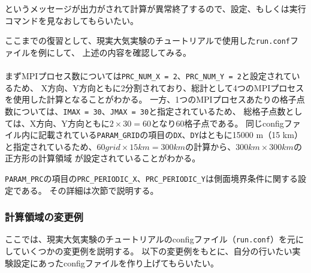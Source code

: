 \noindent というメッセージが出力がされて計算が異常終了するので、設定、もしくは実行コマンドを見なおしてもらいたい。

ここまでの復習として、現実大気実験のチュートリアルで使用した\verb|run.conf|ファイルを例にして、
上述の内容を確認してみる。\\

{\small {\gt
{}}}\\

\noindent まずMPIプロセス数については\verb|PRC_NUM_X = 2|、\verb|PRC_NUM_Y = 2|と設定されているため、
X方向、Y方向ともに2分割されており、総計として4つのMPIプロセスを使用した計算となることがわかる。
一方、1つのMPIプロセスあたりの格子点数については、\verb|IMAX = 30|、\verb|JMAX = 30|と指定されているため、
総格子点数としては、X方向、Y方向ともに$2 \times 30 = 60$となり60格子点である。
同じconfigファイル内に記載されている\verb|PARAM_GRID|の項目の\verb|DX|、\verb|DY|はともに15000 m（15 km）
と指定されているため、$60 grid \times 15 km = 300 km$の計算から、$300 km \times 300 km$の正方形の計算領域
が設定されていることがわかる。

\verb|PARAM_PRC|の項目の\verb|PRC_PERIODIC_X|、\verb|PRC_PERIODIC_Y|は側面境界条件に関する設定である。
その詳細は次節で説明する。


\subsubsection{計算領域の変更例}
ここでは、現実大気実験のチュートリアルのconfigファイル（\verb|run.conf|）を元にしていくつかの変更例を説明する。
以下の変更例をもとに、自分の行いたい実験設定にあったconfigファイルを作り上げてもらいたい。\\


